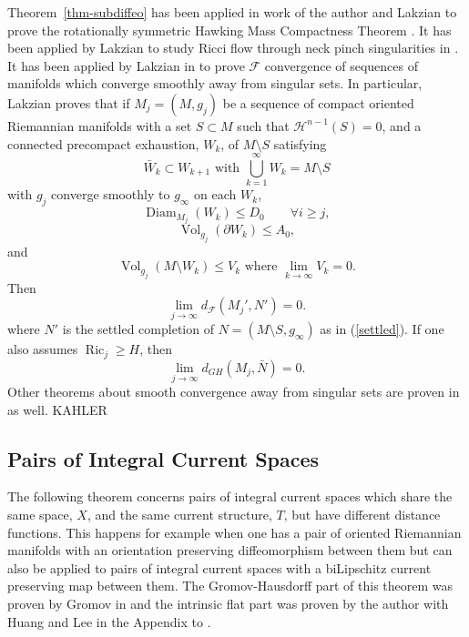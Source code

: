 \documentclass[12pt]{amsart}
\begin{document}
Theorem~\ref{thm-subdiffeo}
has been applied in work of the author and Lakzian
to prove the rotationally symmetric Hawking Mass Compactness Theorem
\cite{LeFloch-Sormani-1}.  It has been applied by Lakzian to study
Ricci flow through neck pinch singularities in \cite{Lakzian-Cont-Ricci}.
It has been applied by Lakzian in \cite{Lakzian-Diameter} to prove 
$\mathcal{F}$ convergence of sequences of manifolds which converge 
smoothly away from singular sets.   In particular, Lakzian proves that if 
$M_j=(M,g_j)$ be a sequence of compact oriented Riemannian manifolds
with a set $S\subset M$ such that $\mathcal{H}^{n-1}(S)=0$,
and a connected precompact exhaustion,
$W_k$, of $M\setminus S$ satisfying 
\begin{equation} \label{defn-precompact-exhaustion}
\bar{W}_k \subset W_{k+1} \textrm{ with } 
\bigcup_{k=1}^\infty W_k=M\setminus S
\end{equation}
with $g_j$ converge smoothly to $g_\infty$ on each $W_k$,
\begin{equation}\label{m-diam}
{\operatorname{Diam}}_{M_j}(W_k) \le D_0 \qquad \forall i\ge j, 
\end{equation}
\begin{equation} \label{m-area}
{\operatorname{Vol}}_{g_j}(\partial W_k) \le A_0,
\end{equation}
and
\begin{equation} \label{m-edge-volume}
{\operatorname{Vol}}_{g_j}(M\setminus W_k) \le V_k \textrm{ where } \lim_{k\to\infty}V_k=0.
\end{equation}
Then
\begin{equation}
\lim_{j\to \infty} d_{\mathcal{F}}(M_j', N')=0.
\end{equation}
where  $N'$ is the settled completion
of $N=(M\setminus S, g_\infty)$ as in (\ref{settled}).
If one also assumes ${\operatorname{Ric}}_j\ge H$, then 
\begin{equation}
\lim_{j\to \infty} d_{GH}(M_j, \bar{N})=0.
\end{equation}
Other theorems about smooth convergence away from singular
sets are proven in \cite{Lakzian-Diameter} as well.   KAHLER

\subsection{Pairs of Integral Current Spaces}

The following theorem concerns pairs of integral current spaces
which share the same space, $X$, and the same current structure, $T$,
but have different distance functions.  This happens for example when
one has a pair of oriented Riemannian manifolds with an orientation
preserving diffeomorphism between them but can also be applied to
pairs of integral current spaces with a biLipschitz current preserving map
between them.
The Gromov-Hausdorff part of this theorem 
was proven by Gromov in \cite{Gromov-metric} and the intrinsic
flat part was proven by the author with Huang and Lee
in the Appendix to \cite{HLS}. 
\end{document}
